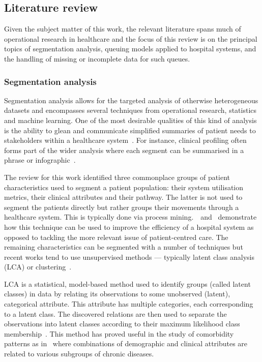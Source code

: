 \subsection{Literature review}\label{subsec:review}

Given the subject matter of this work, the relevant literature spans much of
operational research in healthcare and the focus of this review is on the
principal topics of segmentation analysis, queuing models applied to hospital
systems, and the handling of missing or incomplete data for such queues.

\subsubsection{Segmentation analysis}

Segmentation analysis allows for the targeted analysis of otherwise
heterogeneous datasets and encompasses several techniques from operational
research, statistics and machine learning. One of the most desirable qualities
of this kind of analysis is the ability to glean and communicate simplified
summaries of patient needs to stakeholders within a healthcare
system~\cite{Vuik2016b, Yoon2020}. For instance, clinical profiling often
forms part of the wider analysis where each segment can be summarised in a
phrase or infographic~\cite{Vuik2016a, Yan2019}.

The review for this work identified three commonplace groups of patient
characteristics used to segment a patient population: their system
utilisation metrics, their clinical attributes and their pathway. The latter
is not used to segment the patients directly but rather groups their movements
through a healthcare system. This is typically done via process
mining.~\cite{Arnolds2018}~and~\cite{Delias2015} demonstrate how this technique
can be used to improve the efficiency of a hospital system as opposed to
tackling the more relevant issue of patient-centred care. The remaining
characteristics can be segmented with a number of techniques but recent works
tend to use unsupervised methods --- typically latent class analysis (LCA) or
clustering~\cite{Yan2018}.

LCA is a statistical, model-based method used to identify groups (called latent
classes) in data by relating its observations to some unobserved (latent),
categorical attribute. This attribute has multiple categories, each
corresponding to a latent class. The discovered relations are then used to
separate the observations into latent classes according to their maximum
likelihood class membership~\cite{Hagenaars2002,Lazarsfeld1968}. This method has
proved useful in the study of comorbidity patterns as
in~\cite{Kuwornu2014,Larsen2017} where combinations of demographic and clinical
attributes are related to various subgroups of chronic diseases.

